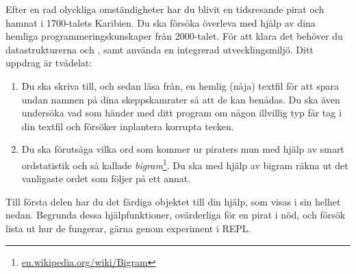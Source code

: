 Efter en rad olyckliga omständigheter har du blivit en tidsresande pirat och hamnat i 1700-talets Karibien. Du ska försöka överleva med hjälp av dina hemliga programmeringskunskaper från 2000-talet. För att klara det behöver du datastrukturerna  och , samt använda en integrerad utvecklingsmiljö.
Ditt uppdrag är tvådelat:
\begin{enumerate}
\item Du ska skriva till, och sedan läsa från, en hemlig (nåja) textfil för att spara undan namnen på dina skeppskamrater så att de kan benådas. Du ska även undersöka vad som händer med ditt program om någon illvillig typ får tag i din textfil och försöker inplantera korrupta tecken.
\item Du ska förutsäga vilka ord som kommer ur piraters mun med hjälp av smart ordstatistik och så kallade \emph{bigram}\footnote{\href{https://en.wikipedia.org/wiki/Bigram}{en.wikipedia.org/wiki/Bigram}}. Du ska med hjälp av bigram räkna ut det vanligaste ordet som följer på ett annat.  
\end{enumerate}

Till första delen har du det färdiga objektet  till din hjälp, som visas i sin helhet nedan. Begrunda dessa hjälpfunktioner, ovärderliga för en pirat i nöd, och försök lista ut hur de fungerar, gärna genom experiment i REPL.



%    
%    
%    


